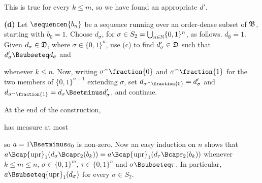{\noindent This is true for every $k\le m$, so we have found an appropriate $d'$.

\medskip

{\bf (d)} Let $\sequencen{b_n}$ be a sequence running over an order-dense subset of
$\frak B$, starting with $b_0=1$.
Choose $d_{\sigma}$, for $\sigma\in S_2=\bigcup_{n\in\Bbb N}\{0,1\}^n$, as
follows.   $d_{\emptyset}=1$.   Given $d_{\sigma}\in\frak D$, where
$\sigma\in\{0,1\}^n$, use (c) to find $d_{\sigma}'\in\frak D$ such that
$d_{\sigma}'\Bsubseteq d_{\sigma}$ and


\noindent whenever $k\le n$.   Now, writing $\sigma^{\smallfrown}\fraction{0}$ and
$\sigma^{\smallfrown}\fraction{1}$ for the two members of $\{0,1\}^{n+1}$ extending $\sigma$,
set $d_{\sigma^{\smallfrown}\fraction{0}}=d'_{\sigma}$ and
$d_{\sigma^{\smallfrown}\fraction{1}}=d_{\sigma}\Bsetminus d'_{\sigma}$, and continue.

At the end of the construction,


\noindent has measure at most


\noindent so $a=1\Bsetminus a_0$ is non-zero.   Now an easy induction on $n$ shows
that $a\Bcap{\upr}_1(d_{\sigma}\Bcap\varepsilon_2(b_k))
=a\Bcap{\upr}_1(d_{\tau}\Bcap\varepsilon_2(b_k))$ whenever $k\le m\le n$,
$\sigma\in\{0,1\}^m$, $\tau\in\{0,1\}^n$ and $\sigma\Bsubseteq\tau$.
In particular,
$a\Bsubseteq{\upr}_1(d_{\sigma})$ for every $\sigma\in S_2$.

}

